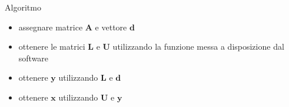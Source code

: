 \begin{frame}{Algoritmo}
\label{algoritmo}
\begin{itemize}
 
\item
  assegnare matrice \(\mathbf{A}\) e vettore \(\mathbf{d}\)
\item
  ottenere le matrici \(\mathbf{L}\) e \(\mathbf{U}\) utilizzando la
  funzione messa a disposizione dal software
\item
  ottenere \(\mathbf{y}\) utilizzando \(\mathbf{L}\) e \(\mathbf{d}\)
\item
  ottenere \(\mathbf{x}\) utilizzando \(\mathbf{U}\) e \(\mathbf{y}\)
\end{itemize}
\end{frame}
